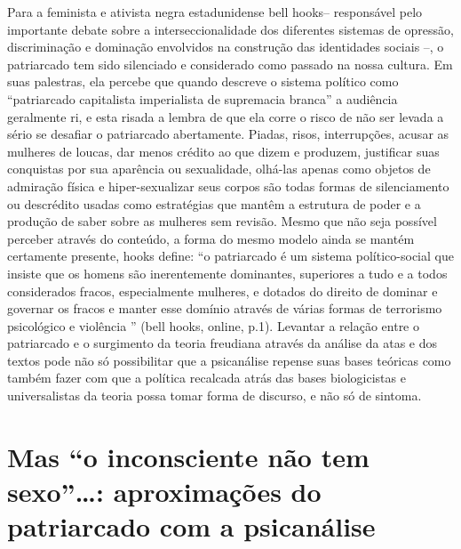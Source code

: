 Para a feminista e ativista negra estadunidense bell hooks-- responsável
pelo importante debate sobre a interseccionalidade dos diferentes
sistemas de opressão, discriminação e dominação envolvidos na construção
das identidades sociais --, o patriarcado tem sido silenciado e
considerado como passado na nossa cultura. Em suas palestras, ela
percebe que quando descreve o sistema político como ``patriarcado
capitalista imperialista de supremacia branca'' a audiência geralmente
ri, e esta risada a lembra de que ela corre o risco de não ser levada a
sério se desafiar o patriarcado abertamente. Piadas, risos,
interrupções, acusar as mulheres de loucas, dar menos crédito ao que
dizem e produzem, justificar suas conquistas por sua aparência ou
sexualidade, olhá-las apenas como objetos de admiração física e
hiper-sexualizar seus corpos são todas formas de silenciamento ou
descrédito usadas como estratégias que mantêm a estrutura de poder e a
produção de saber sobre as mulheres sem revisão. Mesmo que não seja
possível perceber através do conteúdo, a forma do mesmo modelo ainda se
mantém certamente presente, hooks define: ``o patriarcado é um sistema
político-social que insiste que os homens são inerentemente dominantes,
superiores a tudo e a todos considerados fracos, especialmente mulheres,
e dotados do direito de dominar e governar os fracos e manter esse
domínio através de várias formas de terrorismo psicológico e violência
'' (bell hooks, online, p.1). Levantar a relação entre o patriarcado e o
surgimento da teoria freudiana através da análise da atas e dos textos
pode não só possibilitar que a psicanálise repense suas bases teóricas
como também fazer com que a política recalcada atrás das bases
biologicistas e universalistas da teoria possa tomar forma de discurso,
e não só de sintoma.

\section{Mas ``o inconsciente não tem sexo''\ldots{}: aproximações do
patriarcado com a psicanálise }

